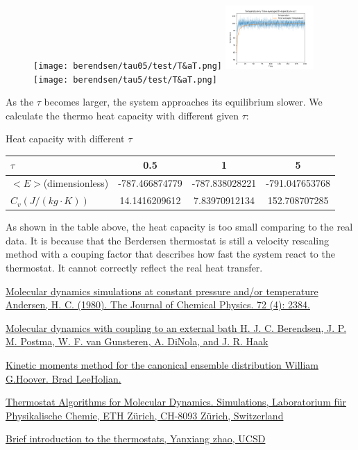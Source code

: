 \documentclass{article}
\begin{document}
\begin{spacing}{1}
\begin{figure}[htbp]
  \centering
  \texttt{[image: berendsen/tau05/test/T\&aT.png]}
  \includegraphics[width=0.3\textwidth]{berendsen/tau1/test/T&aT.png}
  \texttt{[image: berendsen/tau5/test/T\&aT.png]}
\end{figure}

As the $\tau$ becomes larger, the system approaches its equilibrium slower. We calculate the thermo heat capacity with different given $\tau$:


\begin{center}
Heat capacity with different $\tau$

\begin{tabular}{lccc}
\hline
$\tau$ & 0.5 & 1 & 5\\ \hline  
$<E>$(dimensionless) & -787.466874779 & -787.838028221 & -791.047653768 \\
$C_v(J/(kg\cdot K))$ & 14.1416209612 & 7.83970912134 & 152.708707285 \\\hline
\end{tabular}
\end{center}

As shown in the table above, the heat capacity is too small comparing to the real data. It is because that the Berdersen thermostat is still a velocity rescaling method with a couping factor that describes how fast the system react to the thermostat. It cannot correctly reflect the real heat transfer.


\end{spacing}
\begin{thebibliography}{1}

\href {http://aip.scitation.org/doi/10.1063/1.439486}{Molecular dynamics simulations at constant pressure and/or temperature Andersen, H. C. (1980). The Journal of Chemical Physics. 72 (4): 2384.}

\href {https://doi.org/10.1063/1.448118}{Molecular dynamics with coupling to an external bath H. J. C. Berendsen, J. P. M. Postma, W. F. van Gunsteren, A. DiNola, and J. R. Haak}

\href {http://www.sciencedirect.com/science/article/pii/0375960195009736?via%3Dihub}{Kinetic moments method for the canonical ensemble distribution
William G.Hoover. Brad LeeHolian.}

\href {https://doi.org/10.1007/b99427}{Thermostat Algorithms for Molecular Dynamics. Simulations, Laboratorium für Physikalische Chemie, ETH Zürich, CH-8093 Zürich, Switzerland}

\href {http://www.math.ucsd.edu/~y1zhao/ResearchNotes/ResearchNote007Thermostat.pdf}{Brief introduction to the thermostats, Yanxiang zhao, UCSD}

 
\end{thebibliography}
\end{document}
